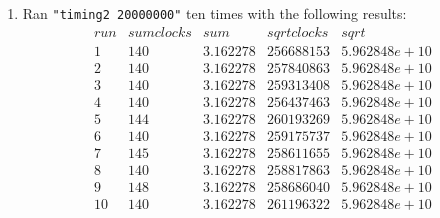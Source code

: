 \documentclass[12pt,fleqn,leqno,letterpaper]{article}
\begin{document}
\begin{enumerate}
    \item Ran \texttt{"timing2 20000000"} ten times with the following
        results:\\
        $$
        \begin{array}{lcccc}
            run & sum clocks & sum & sqrt clocks & sqrt \\
            1 & 140 & 3.162278 & 256688153 & 5.962848e+10 \\
            2 & 140 & 3.162278 & 257840863 & 5.962848e+10 \\
            3 & 140 & 3.162278 & 259313408 & 5.962848e+10 \\
            4 & 140 & 3.162278 & 256437463 & 5.962848e+10 \\
            5 & 144 & 3.162278 & 260193269 & 5.962848e+10 \\
            6 & 140 & 3.162278 & 259175737 & 5.962848e+10 \\
            7 & 145 & 3.162278 & 258611655 & 5.962848e+10 \\
            8 & 140 & 3.162278 & 258817863 & 5.962848e+10 \\
            9 & 148 & 3.162278 & 258686040 & 5.962848e+10 \\
            10 & 140 & 3.162278 & 261196322 & 5.962848e+10
        \end{array}
        $$
\end{enumerate}


% 
\end{document}
